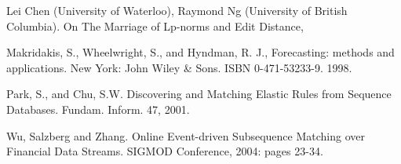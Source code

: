 \begin{thebibliography}{9}
Lei Chen (University of Waterloo), Raymond Ng (University of British Columbia). On The Marriage of Lp-norms and Edit Distance,

Makridakis, S., Wheelwright, S., and Hyndman, R. J.,
Forecasting: methods and applications. New York: John
Wiley \& Sons. ISBN 0-471-53233-9. 1998.

Park, S., and Chu, S.W. Discovering and Matching Elastic Rules from Sequence Databases. Fundam. Inform. 47, 2001.

Wu, Salzberg and Zhang. Online Event-driven Subsequence Matching over Financial Data Streams. SIGMOD Conference, 2004: pages 23-34.

\end{thebibliography}